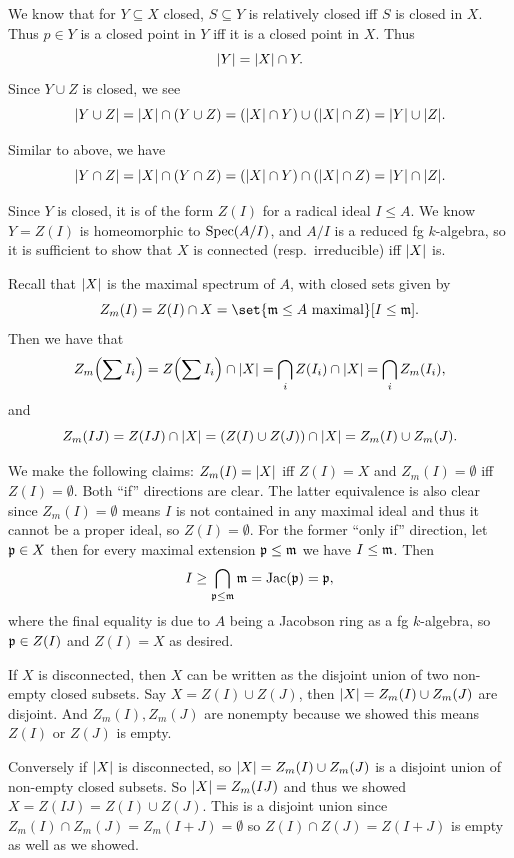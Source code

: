     \item
    \benum
        \item We know that for $Y\subseteq X$ closed, $S\subseteq Y$ is relatively closed iff $S$ is closed in $X$.
        Thus $p\in Y$ is a closed point in $Y$ iff it is a closed point in $X$.
        Thus
        $$ \mathopen{}\mathclose{\left|Y\right|} = \mathopen{}\mathclose{\left|X\right|}\cap Y . $$
        Since $Y\cup Z$ is closed, we see
        $$ \mathopen{}\mathclose{\left|Y\cup Z\right|} = \mathopen{}\mathclose{\left|X\right|}\cap(Y\cup Z) = (\mathopen{}\mathclose{\left|X\right|}\cap Y)\cup(\mathopen{}\mathclose{\left|X\right|}\cap Z) = \mathopen{}\mathclose{\left|Y\right|}\cup\mathopen{}\mathclose{\left|Z\right|} . $$
        \item Similar to above, we have
        $$ \mathopen{}\mathclose{\left|Y\cap Z\right|} = \mathopen{}\mathclose{\left|X\right|}\cap(Y\cap Z) = (\mathopen{}\mathclose{\left|X\right|}\cap Y)\cap(\mathopen{}\mathclose{\left|X\right|}\cap Z) = \mathopen{}\mathclose{\left|Y\right|}\cap\mathopen{}\mathclose{\left|Z\right|} . $$
        \item Since $Y$ is closed, it is of the form $Z(I)$ for a radical ideal $I\leq A$.
        We know $Y=Z(I)$ is homeomorphic to ${\rm Spec}(A/I)$, and $A/I$ is a reduced fg $k$-algebra, so it is sufficient to show that $X$
        is connected (resp.\ irreducible) iff $\mathopen{}\mathclose{\left|X\right|}$ is.

        Recall that $\mathopen{}\mathclose{\left|X\right|}$ is the maximal spectrum of $A$, with closed sets given by
        $$ Z_m(I) = Z(I)\cap X = \set{\m\leq A\hbox{ maximal}}[I\leq\m] . $$
        Then we have that
        $$ Z_m\mathopen{}\mathclose{\left(\sum I_i\right)} = Z\mathopen{}\mathclose{\left(\sum I_i\right)}\cap\mathopen{}\mathclose{\left|X\right|} = \bigcap_iZ(I_i)\cap\mathopen{}\mathclose{\left|X\right|} = \bigcap_iZ_m(I_i), $$
        and
        $$ Z_m\mathopen{}\mathclose{\left(IJ\right)} = Z(IJ)\cap\mathopen{}\mathclose{\left|X\right|} = (Z(I)\cup Z(J))\cap\mathopen{}\mathclose{\left|X\right|} = Z_m(I)\cup Z_m(J) . $$

        We make the following claims: $Z_m(I)=\mathopen{}\mathclose{\left|X\right|}$ iff $Z(I)=X$ and $Z_m(I)=\emptyset$ iff $Z(I)=\emptyset$.
        Both ``if'' directions are clear.
        The latter equivalence is also clear since $Z_m(I)=\emptyset$ means $I$ is not contained in any maximal ideal and thus it cannot be a proper
        ideal, so $Z(I)=\emptyset$.
        For the former ``only if'' direction, let ${{\frak p}}\in X$ then for every maximal extension ${{\frak p}}\leq{{\frak m}}$ we have $I\leq{{\frak m}}$.
        Then
        $$ I \geq \bigcap_{{{\frak p}}\leq{{\frak m}}}{{\frak m}} = {\rm Jac}({{\frak p}}) = {{\frak p}} , $$
        where the final equality is due to $A$ being a Jacobson ring as a fg $k$-algebra, so ${{\frak p}}\in Z(I)$ and $Z(I)=X$ as desired.

        If $X$ is disconnected, then $X$ can be written as the disjoint union of two non-empty closed subsets.
        Say $X=Z(I)\cup Z(J)$, then $\mathopen{}\mathclose{\left|X\right|}=Z_m(I)\cup Z_m(J)$ are disjoint.
        And $Z_m(I),Z_m(J)$ are nonempty because we showed this means $Z(I)$ or $Z(J)$ is empty.

        Conversely if $\mathopen{}\mathclose{\left|X\right|}$ is disconnected, so $\mathopen{}\mathclose{\left|X\right|}=Z_m(I)\cup Z_m(J)$ is a disjoint union of non-empty closed subsets.
        So $\mathopen{}\mathclose{\left|X\right|}=Z_m(IJ)$ and thus we showed $X=Z(IJ)=Z(I)\cup Z(J)$.
        This is a disjoint union since $Z_m(I)\cap Z_m(J)=Z_m(I+J)=\emptyset$ so $Z(I)\cap Z(J)=Z(I+J)$ is empty as well as we showed.

